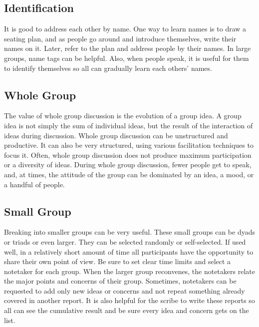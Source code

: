 \subsection{Identification}

It is good to address each other by name. One way to learn names
is to draw a seating plan, and as people go around and introduce
themselves, write their names on it. Later, refer to the plan and
address people by their names. In large groups, name tags can be
helpful. Also, when people speak, it is useful for them to identify
themselves so all can gradually learn each others' names.

\subsection{Whole Group}

The value of whole group discussion is the evolution of a group
idea. A group idea is not simply the sum of individual ideas, but
the result of the interaction of ideas during discussion. Whole
group discussion can be unstructured and productive. It can also be
very structured, using various facilitation techniques to focus
it. Often, whole group discussion does not produce maximum
participation or a diversity of ideas. During whole group
discussion, fewer people get to speak, and, at times, the
attitude of the group can be dominated by an idea, a mood, or a
handful of people.

\subsection{Small Group}

Breaking into smaller groups can be very useful. These small
groups can be dyads or triads or even larger. They can be selected
randomly or self-selected.  If used well, in a relatively short
amount of time all participants have the opportunity to share their
own point of view. Be sure to set clear time limits and select a
notetaker for each group. When the larger group reconvenes, the
notetakers relate the major points and concerns of
their group. Sometimes, notetakers can be requested to add only new
ideas or concerns and not repeat something already covered in
another report. It is also helpful for the scribe to write these
reports so all can see the cumulative result and be sure every idea
and concern gets on the list.

